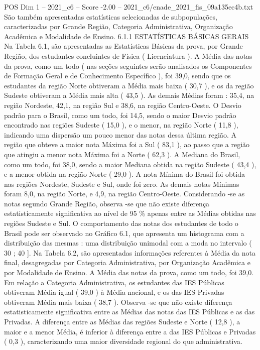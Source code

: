 \begin{textsample}{POS Dim 1 – 2021\_c6 – Score -2.00 – 2021\_c6/enade\_2021\_fis\_09a135ec4b.txt}
São também apresentadas estatísticas selecionadas de subpopulações, caracterizadas por Grande Região, Categoria Administrativa, Organização Acadêmica e Modalidade de Ensino. 6.1.1 ESTATÍSTICAS BÁSICAS GERAIS Na Tabela 6.1, são apresentadas as Estatísticas Básicas da prova, por Grande Região, dos estudantes concluintes de Física ( Licenciatura ).
A Média das notas da prova, como um todo ( nas seções seguintes serão analisados os Componentes de Formação Geral e de Conhecimento Específico ), foi 39,0, sendo que os estudantes da região Norte obtiveram a Média mais baixa ( 30,7 ), e os da região Sudeste obtiveram a Média mais alta ( 43,5 ).
As demais Médias foram : 35,4, na região Nordeste, 42,1, na região Sul e 38,6, na região Centro-Oeste.
O Desvio padrão para o Brasil, como um todo, foi 14,5, sendo o maior Desvio padrão encontrado nas regiões Sudeste ( 15,0 ), e o menor, na região Norte ( 11,8 ), indicando uma dispersão um pouco menor das notas dessa última região.
A região que obteve a maior nota Máxima foi a Sul ( 83,1 ), ao passo que a região que atingiu a menor nota Máxima foi a Norte ( 62,3 ).
A Mediana do Brasil, como um todo, foi 38,0, sendo a maior Mediana obtida na região Sudeste ( 43,4 ), e a menor obtida na região Norte ( 29,0 ).
A nota Mínima do Brasil foi obtida nas regiões Nordeste, Sudeste e Sul, onde foi zero.
As demais notas Mínimas foram 8,0, na região Norte, e 4,9, na região Centro-Oeste.
Considerando -se as notas segundo Grande Região, observa -se que não existe diferença estatisticamente significativa ao nível de 95 \% apenas entre as Médias obtidas nas regiões Sudeste e Sul.
O comportamento das notas dos estudantes de todo o Brasil pode ser observado no Gráfico 6.1, que apresenta um histograma com a distribuição das mesmas : uma distribuição unimodal com a moda no intervalo ( 30 ; 40 ].
Na Tabela 6.2, são apresentadas informações referentes à Média da nota final, desagregadas por Categoria Administrativa, por Organização Acadêmica e por Modalidade de Ensino.
A Média das notas da prova, como um todo, foi 39,0.
Em relação a Categoria Administrativa, os estudantes das IES Públicas obtiveram Média igual ( 39,0 ) à Média nacional, e os das IES Privadas obtiveram Média mais baixa ( 38,7 ).
Observa -se que não existe diferença estatisticamente significativa entre as Médias das notas das IES Públicas e as das Privadas.
A diferença entre as Médias das regiões Sudeste e Norte ( 12,8 ), a maior e a menor Média, é inferior à diferença entre a das IES Públicas e Privadas ( 0,3 ), caracterizando uma maior diversidade regional do que administrativa.

\end{textsample}
